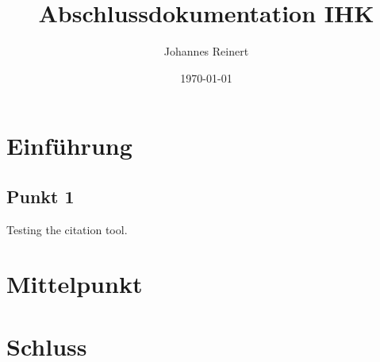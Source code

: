 \documentclass[a4paper]{article}
\title{Abschlussdokumentation IHK}
\author{Johannes Reinert}
\date{\today}
\begin{document}
\maketitle
\newpage

\tableofcontents

\newpage

\section{Einführung}
\subsection{Punkt 1}

Testing the citation \cite{test} tool.

\section{Mittelpunkt}

\section{Schluss}


\printbibliography
\end{document}
